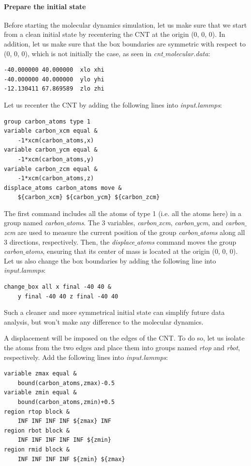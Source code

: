 \documentclass[9pt,tutorial]{livecoms}
\begin{document}
\paragraph{Prepare the initial state}
Before starting the molecular dynamics simulation, let us make sure that we start from a clean initial state
by recentering the CNT at the origin (0, 0, 0). In addition, let us make sure that the box boundaries are symmetric with respect to (0, 0, 0), which is not initially the case, as seen in \textit{cnt$\_$molecular.data}:
{\normalsize \begin{verbatim}
-40.000000 40.000000  xlo xhi
-40.000000 40.000000  ylo yhi
-12.130411 67.869589  zlo zhi
\end{verbatim}}
Let us recenter the CNT by adding the following lines into \textit{input.lammps}:
{\normalsize \begin{verbatim}
group carbon_atoms type 1
variable carbon_xcm equal &
    -1*xcm(carbon_atoms,x)
variable carbon_ycm equal &
    -1*xcm(carbon_atoms,y)
variable carbon_zcm equal &
    -1*xcm(carbon_atoms,z)
displace_atoms carbon_atoms move &
    ${carbon_xcm} ${carbon_ycm} ${carbon_zcm}
\end{verbatim}}
The first command includes all the atoms of type 1 (i.e. all the atoms here) in a group named \textit{carbon$\_$atoms}. 
The 3 variables, \textit{carbon$\_$xcm}, \textit{carbon$\_$ycm}, and \textit{carbon$\_$zcm} are used to measure
the current position of the group \textit{carbon$\_$atoms} along all 3 directions, respectively. Then, the \textit{displace$\_$atoms} command moves the group \textit{carbon$\_$atoms}, ensuring that its center of mass is located at the origin (0, 0, 0).
Let us also change the box boundaries by adding the following line into \textit{input.lammps}:
{\normalsize \begin{verbatim}
change_box all x final -40 40 &
    y final -40 40 z final -40 40
\end{verbatim}}
Such a cleaner and more symmetrical initial state can simplify future data analysis, but won't make any difference to the molecular dynamics.

A displacement will be imposed on the edges of the CNT. To do so, let us isolate the atoms from the two edges and place them into groups named \textit{rtop} and \textit{rbot}, respectively. Add the following lines into \textit{input.lammps}:
{\normalsize \begin{verbatim}
variable zmax equal &
    bound(carbon_atoms,zmax)-0.5
variable zmin equal &
    bound(carbon_atoms,zmin)+0.5
region rtop block &
    INF INF INF INF ${zmax} INF
region rbot block &
    INF INF INF INF INF ${zmin}
region rmid block &
    INF INF INF INF ${zmin} ${zmax}
\end{verbatim}}
\end{document}
